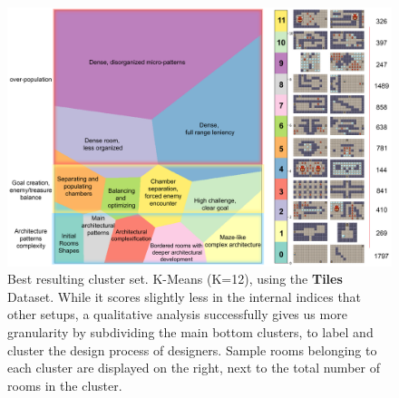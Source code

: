 \begin{figure}[t]
\centerline{\includegraphics[width=\textwidth]{figures/final-cluster.png}}
\caption{Best resulting cluster set. K-Means (K=12), using the \textbf{Tiles} Dataset. While it scores slightly less in the internal indices that other setups, a qualitative analysis successfully gives us more granularity by subdividing the main bottom clusters, to label and cluster the design process of designers. Sample rooms belonging to each cluster are displayed on the right, next to the total number of rooms in the cluster.} \label{p6fig:all-clusters}
\end{figure}




